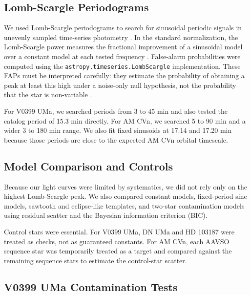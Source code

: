 \documentclass[11pt]{article}
\begin{document}
\subsection{Lomb-Scargle Periodograms}

We used Lomb-Scargle periodograms to search for sinusoidal periodic signals in
unevenly sampled time-series photometry \cite{lomb1976,scargle1982}. In the
standard normalization, the Lomb-Scargle power measures the fractional
improvement of a sinusoidal model over a constant model at each tested frequency
\cite{astropyLS}. False-alarm probabilities were computed using the
\texttt{astropy.timeseries.LombScargle} implementation. These FAPs must be
interpreted carefully: they estimate the probability of obtaining a peak at
least this high under a noise-only null hypothesis, not the probability that the
star is non-variable \cite{baluev2008,astropyLS}.

For V0399 UMa, we searched periods from 3 to 45 min and also tested the catalog
period of 15.3 min directly. For AM CVn, we searched 5 to 90 min and a wider
3 to 180 min range. We also fit fixed sinusoids at 17.14 and 17.20 min because
those periods are close to the expected AM CVn orbital timescale.

\subsection{Model Comparison and Controls}

Because our light curves were limited by systematics, we did not rely only on
the highest Lomb-Scargle peak. We also compared constant models, fixed-period
sine models, sawtooth and eclipse-like templates, and two-star contamination
models using residual scatter and the Bayesian information criterion (BIC).

Control stars were essential. For V0399 UMa, DN UMa and HD 103187 were treated
as checks, not as guaranteed constants. For AM CVn, each AAVSO sequence star was
temporarily treated as a target and compared against the remaining sequence
stars to estimate the control-star scatter.

\subsection{V0399 UMa Contamination Tests}
\end{document}

